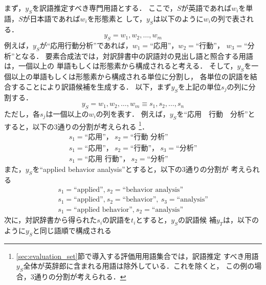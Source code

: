 \documentclass[japanese]{jnlp_1.3a}
\begin{document}
まず，$y_S$を訳語推定すべき専門用語とする．
ここで，$S$が英語であれば$w_i$を単語，$S$が日本語であれば$w_i$を形態素と
して，$y_S$は以下のように$w_i$の列で表される．
\begin{equation}
 \label{eq:y_S}
 y_S=w_1,w_2,\ldots,w_m
\end{equation}
例えば，$y_S$が“応用行動分析”であれば，$w_1=$“応用”，$w_2=$“行動”，
$w_3=$“分析”となる．
要素合成法では，対訳辞書中の訳語対の見出し語と照合する用語は，一個以上の
単語もしくは形態素から構成されると考える．
そして，$y_S$を一個以上の単語もしくは形態素から構成される単位に分割し，
各単位の訳語を結合することにより訳語候補を生成する．
以下，まず$y_S$を上記の単位$s_j$の列に分割する．
\begin{equation}
 y_S=w_1,w_2,\ldots,w_m \equiv s_1,s_2,\ldots,s_n
\end{equation}
ただし，各$s_j$は一個以上の$w_i$の列を表す．
例えば，$y_S$を“応用　行動　分析”とすると，以下の3通りの分割が考えられる
\footnote{\ref{sec:evaluation_set}節で導入する評価用用語集合では，訳語推定
すべき用語$y_S$全体が英辞郎に含まれる用語は除外している．これを除くと，
この例の場合，3通りの分割が考えられる．}．
\begin{equation}
 \begin{array}{l}
  \label{eq:bunkatsu_ouyou}
  s_1=\mbox{“応用”，}\ s_2=\mbox{“行動 分析”}\\
  s_1=\mbox{“応用”，}\ s_2=\mbox{“行動”，}\ s_3=\mbox{“分析”}\\
  s_1=\mbox{“応用 行動”，}\ s_2=\mbox{“分析”}
 \end{array}
\end{equation}
また，$y_S$を``applied behavior analysis''とすると，以下の3通りの分割が
考えられる
\begin{equation}
 \begin{array}{l}
  \label{eq:bunkatsu_applied}
  s_1=\mbox{``applied'',}\ s_2=\mbox{``behavior analysis''}\\
  s_1=\mbox{``applied'',}\ s_2=\mbox{``behavior''},\ s_3=\mbox{``analysis''}\\
  s_1=\mbox{``applied behavior'',}\ s_2=\mbox{``analysis''}
 \end{array}
\end{equation}
次に，対訳辞書から得られた$s_i$の訳語を$t_i$とすると，$y_S$の訳語候
補$y_T$は，以下のように$y_S$と同じ語順で構成される
\end{document}
